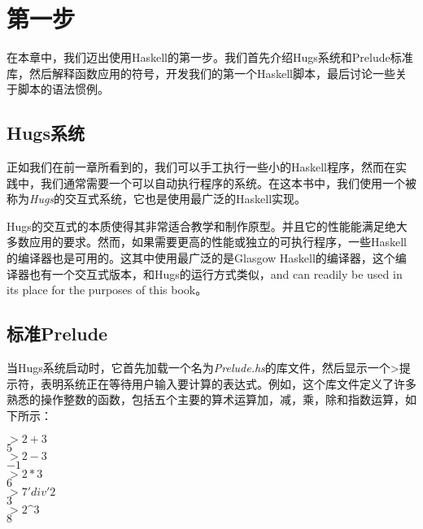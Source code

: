 \chapter{第一步}

在本章中，我们迈出使用Haskell的第一步。我们首先介绍Hugs系统和Prelude标准库，然后解释函数应用的符号，开发我们的第一个Haskell脚本，最后讨论一些关于脚本的语法惯例。

\section{Hugs系统}
正如我们在前一章所看到的，我们可以手工执行一些小的Haskell程序，然而在实践中，我们通常需要一个可以自动执行程序的系统。在这本书中，我们使用一个被称为\textit{Hugs}的交互式系统，它也是使用最广泛的Haskell实现。

Hugs的交互式的本质使得其非常适合教学和制作原型。并且它的性能能满足绝大多数应用的要求。然而，如果需要更高的性能或独立的可执行程序，一些Haskell的编译器也是可用的。这其中使用最广泛的是Glasgow Haskell的编译器，这个编译器也有一个交互式版本，和Hugs的运行方式类似，and can readily be used in its place for the purposes of this book。

\section{标准Prelude}

当Hugs系统启动时，它首先加载一个名为\textit{Prelude.hs}的库文件，然后显示一个>提示符，表明系统正在等待用户输入要计算的表达式。例如，这个库文件定义了许多熟悉的操作整数的函数，包括五个主要的算术运算加，减，乘，除和指数运算，如下所示：

\noindent\hspace*{1cm} $>2 + 3$\\
\hspace*{1cm} $5$\\
\hspace*{1cm} $> 2 - 3$\\
\hspace*{1cm} $-1$\\
\hspace*{1cm} $> 2 * 3$\\
\hspace*{1cm} $6$\\
\hspace*{1cm} $> 7 'div' 2$\\
\hspace*{1cm} $3$\\
\hspace*{1cm} $> 2 \^ 3$\\
\hspace*{1cm} $8$

